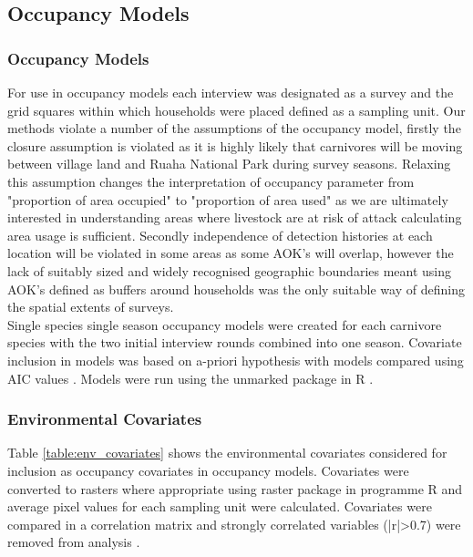 \subsection{Occupancy Models}

\subsubsection{Occupancy Models}
For use in occupancy models each interview was designated as a survey and the grid squares within which households were placed defined as a sampling unit. Our methods violate a number of the assumptions of the occupancy model, firstly the closure assumption is violated as it is highly likely that carnivores will be moving between village land and Ruaha National Park during survey seasons. Relaxing this assumption changes the interpretation of occupancy parameter from "proportion of area occupied" to "proportion of area used" \cite{Mackenzie2004} as we are ultimately interested in understanding areas where livestock are at risk of attack calculating area usage is sufficient. Secondly independence of detection histories at each location will be violated in some areas as some AOK's will overlap, however the lack of suitably sized and widely recognised geographic boundaries meant using AOK's defined as buffers around households was the only suitable way of defining the spatial extents of surveys.\\

Single species single season occupancy models were created for each carnivore species with the two initial interview rounds combined into one season. Covariate inclusion in models was based on a-priori hypothesis with models compared using AIC values \cite{Burnham2003}. Models were run using the unmarked package \cite{Fiske2011} in R \cite{RCoreTeam2015}.\\

\subsubsection{Environmental Covariates}
Table \ref{table:env_covariates} shows the environmental covariates considered for inclusion as occupancy covariates in occupancy models. Covariates were converted to rasters where appropriate using raster package \cite{Hijmans2014} in programme R \cite{RCoreTeam2015} and average pixel values for each sampling unit were calculated. Covariates were compared in a correlation matrix and strongly correlated variables (|r|>0.7) were removed from analysis \cite{Dormann_2012}.

